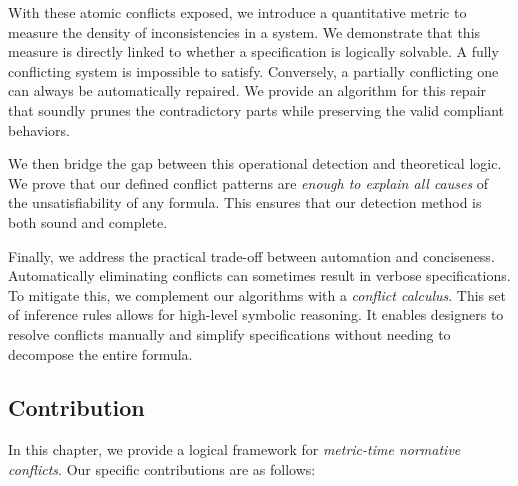 With these atomic conflicts exposed, we introduce a quantitative metric to measure the density of inconsistencies in a system. We demonstrate that this measure is directly linked to whether a specification is logically solvable. A fully conflicting system is impossible to satisfy. Conversely, a partially conflicting one can always be automatically repaired. We provide an algorithm for this repair that soundly prunes the contradictory parts while preserving the valid compliant behaviors.



We then bridge the gap between this operational detection and theoretical logic. We prove that our defined conflict patterns are \emph{enough to explain all causes} of the unsatisfiability of any formula. This ensures that our detection method is both sound and complete.



Finally, we address the practical trade-off between automation and conciseness. Automatically eliminating conflicts can sometimes result in verbose specifications. To mitigate this, we complement our algorithms with a \emph{conflict calculus}. This set of inference rules allows for high-level symbolic reasoning. It enables designers to resolve conflicts manually and simplify specifications without needing to decompose the entire formula.

\subsection{Contribution}



In this chapter, we provide a logical framework for \emph{metric-time normative conflicts}. Our specific contributions are as follows:



